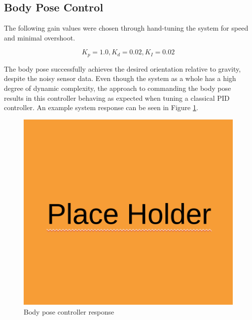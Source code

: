 \subsection{ Body Pose Control }
The following gain values were chosen through hand-tuning the system for speed and minimal overshoot. 

\[K_p = 1.0, K_d = 0.02, K_I = 0.02\]

The body pose successfully achieves the desired orientation relative to gravity, despite the noisy sensor data. Even though the system as a whole has a high degree of dynamic complexity, the approach to commanding the body pose results in this controller behaving as expected when tuning a classical PID controller. An example system response can be seen in Figure \ref{fig:pose_control_response}. 

\begin{figure}[H]
    \centerline{\includegraphics[scale=0.3]{place_holder.png}}
    \caption{ Body pose controller response}
    \label{fig:pose_control_response}
\end{figure}
